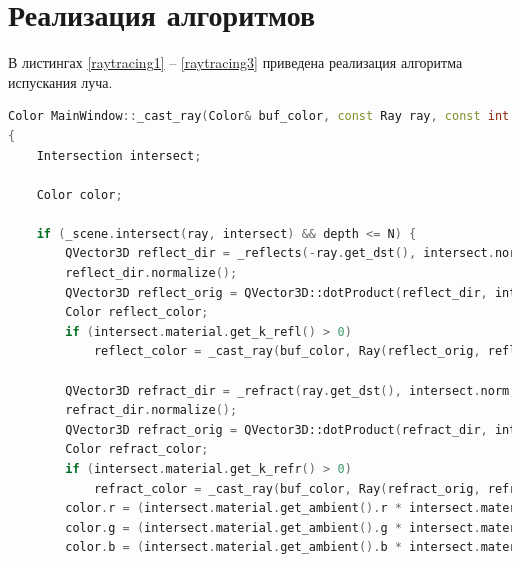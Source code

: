 \section{Реализация алгоритмов}

В листингах \ref{raytracing1}  -- \ref{raytracing3} приведена реализация алгоритма испускания луча.

\begin{lstlisting}[label=raytracing1,caption=Реализация алгоритма испускания луча (начало), language=C++]
Color MainWindow::_cast_ray(Color& buf_color, const Ray ray, const int depth)
{
	Intersection intersect;
	
	Color color;
	
	if (_scene.intersect(ray, intersect) && depth <= N) {
		QVector3D reflect_dir = _reflects(-ray.get_dst(), intersect.norm);
		reflect_dir.normalize();
		QVector3D reflect_orig = QVector3D::dotProduct(reflect_dir, intersect.norm) < 0 ? intersect.point - intersect.norm * EPS : intersect.point + intersect.norm * EPS;
		Color reflect_color;
		if (intersect.material.get_k_refl() > 0)
			reflect_color = _cast_ray(buf_color, Ray(reflect_orig, reflect_dir), depth + 1);
		
		QVector3D refract_dir = _refract(ray.get_dst(), intersect.norm, intersect.material.get_refraction_index());
		refract_dir.normalize();
		QVector3D refract_orig = QVector3D::dotProduct(refract_dir, intersect.norm) < 0 ? intersect.point - intersect.norm * EPS : intersect.point + intersect.norm * EPS;
		Color refract_color;
		if (intersect.material.get_k_refr() > 0)
			refract_color = _cast_ray(buf_color, Ray(refract_orig, refract_dir), depth + 1);
		color.r = (intersect.material.get_ambient().r * intersect.material.get_ka());
		color.g = (intersect.material.get_ambient().g * intersect.material.get_ka());
		color.b = (intersect.material.get_ambient().b * intersect.material.get_ka());
\end{lstlisting}
\clearpage
